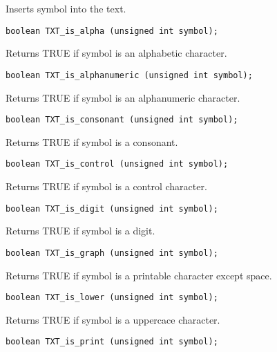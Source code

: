 \documentclass[11pt]{article}
\begin{document}
{\vspace{-0.2cm}
Inserts symbol into the text.

\begin{verbatim}
boolean TXT_is_alpha (unsigned int symbol);
\end{verbatim}

\vspace{-0.2cm}
Returns TRUE if symbol is an alphabetic character.

\begin{verbatim}
boolean TXT_is_alphanumeric (unsigned int symbol);
\end{verbatim}

\vspace{-0.2cm}
Returns TRUE if symbol is an alphanumeric character.

\begin{verbatim}
boolean TXT_is_consonant (unsigned int symbol);
\end{verbatim}

\vspace{-0.2cm}
Returns TRUE if symbol is a consonant.

\begin{verbatim}
boolean TXT_is_control (unsigned int symbol);
\end{verbatim}

\vspace{-0.2cm}
Returns TRUE if symbol is a control character.

\begin{verbatim}
boolean TXT_is_digit (unsigned int symbol);
\end{verbatim}

\vspace{-0.2cm}
Returns TRUE if symbol is a digit.

\begin{verbatim}
boolean TXT_is_graph (unsigned int symbol);
\end{verbatim}

\vspace{-0.2cm}
Returns TRUE if symbol is a printable character except space.

\begin{verbatim}
boolean TXT_is_lower (unsigned int symbol);
\end{verbatim}

\vspace{-0.2cm}
Returns TRUE if symbol is a uppercace character.

\begin{verbatim}
boolean TXT_is_print (unsigned int symbol);
\end{verbatim}

}
\end{document}
